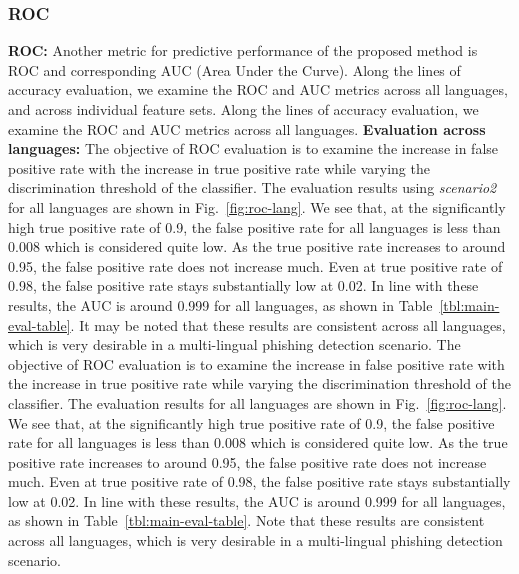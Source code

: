\documentclass[10pt,conference,compsocconf,letterpaper]{IEEEtran}
\begin{document}
\subsubsection{ROC}
\else
\noindent\textbf{ROC:}
\fi
Another  metric for predictive performance of the proposed method is ROC and corresponding AUC (Area Under the Curve).
\iffeateval
Along the lines of accuracy evaluation, we examine the ROC and AUC metrics across all languages, and across individual feature sets. 
\else
Along the lines of accuracy evaluation, we examine the ROC and AUC metrics across all languages.
\fi
\iffeateval
\textbf{Evaluation across languages:} 
The objective of ROC evaluation is to examine the increase in false positive rate with the increase in true positive rate while varying the discrimination threshold of the classifier. The evaluation results using \textit{scenario2} for all languages are shown in Fig.~\ref{fig:roc-lang}. We see that, at the significantly high true positive rate of 0.9, the false positive rate for all languages is less than 0.008 which is considered quite low. As the true positive rate increases to around 0.95, the false positive rate does not increase much.  Even at true positive rate of 0.98, the false positive rate stays substantially low at 0.02. In line with these results, the AUC is around 0.999 for all languages, as shown in Table~\ref{tbl:main-eval-table}. It may be noted that these results are consistent across all languages, which is very desirable in a multi-lingual phishing detection scenario. 
\else
The objective of ROC evaluation is to examine the increase in false positive rate with the increase in true positive rate while varying the discrimination threshold of the classifier. The evaluation results for all languages are shown in Fig.~\ref{fig:roc-lang}. We see that, at the significantly high true positive rate of 0.9, the false positive rate for all languages is less than 0.008 which is considered quite low. As the true positive rate increases to around 0.95, the false positive rate does not increase much.  Even at true positive rate of 0.98, the false positive rate stays substantially low at 0.02. In line with these results, the AUC is around 0.999 for all languages, as shown in Table~\ref{tbl:main-eval-table}. Note that these results are consistent across all languages, which is very desirable in a multi-lingual phishing detection scenario. 
\fi
\end{document}
